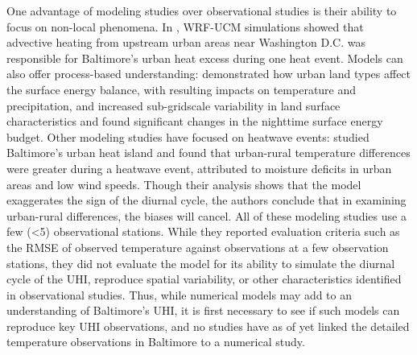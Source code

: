 \documentclass[draft,linenumbers]{agujournal}
\begin{document}
One advantage of 
modeling studies over observational studies is their ability to focus on non-local phenomena.
In
\cite{zhang2011impact}, WRF-UCM simulations showed that advective heating from upstream urban areas near Washington D.C. was responsible for Baltimore's urban heat excess during one heat event. 
Models can also offer process-based understanding: \cite{li2013modeling} demonstrated how urban land types affect the surface energy balance, with resulting impacts on temperature and precipitation, and \cite{li2013development} increased sub-gridscale variability in land surface characteristics and found significant changes in the nighttime surface energy budget. 
Other modeling studies have focused on heatwave events: \cite{li2013synergistic} studied Baltimore's urban heat island and found that urban-rural temperature differences were greater during a heatwave event, attributed to moisture deficits in urban areas and low wind speeds. 
Though their analysis shows that the model exaggerates the sign of the diurnal cycle, the authors conclude that in examining urban-rural differences, the biases will cancel.%
All of these modeling studies use a few (<5) observational stations. While they reported evaluation criteria such as the RMSE of observed temperature against observations at a few observation stations, they did not evaluate the model for its ability to simulate the diurnal cycle of the UHI, reproduce spatial variability, or other characteristics identified in observational studies. Thus, while numerical models may add to an understanding of Baltimore's UHI, it is first necessary to see if such models can reproduce key UHI observations, and no studies have as of yet linked the detailed temperature observations in Baltimore to a numerical study. 

\end{document}
